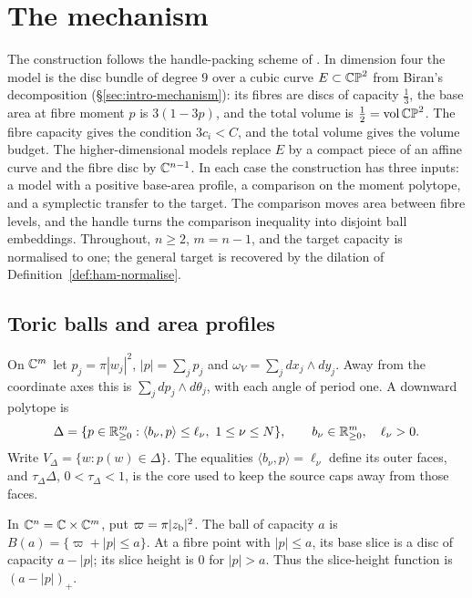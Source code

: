 \section{The mechanism}\label{sec:mech}

The construction follows the handle-packing scheme of \cite{OpenAI2026}. In dimension four the model is
the disc bundle of degree $9$ over a cubic curve $E\subset\mathbb{CP}^2$ from Biran's decomposition \cite{Biran2001}
(\S\ref{sec:intro-mechanism}): its fibres are discs of capacity $\frac13$, the base area at fibre moment $p$ is
$3(1-3p)$, and the total volume is $\frac12=\operatorname{vol}\mathbb{CP}^2$. The fibre capacity gives the condition $3c_i<C$, and the
total volume gives the volume budget. The higher-dimensional models replace $E$ by a compact piece of an affine curve
and the fibre disc by $\mathbb{C}^{n-1}$. In each case the construction has three inputs: a model with a positive base-area
profile, a comparison on the moment polytope, and a symplectic transfer to the target. The comparison moves area
between fibre levels, and the handle turns the comparison inequality into disjoint ball embeddings. Throughout,
$n\ge2$, $m=n-1$, and the target capacity is normalised to one; the general target is recovered by the dilation of
Definition~\ref{def:ham-normalise}.

\subsection{Toric balls and area profiles}\label{sec:mech-toric}

On $\mathbb{C}^m$ let $p_j=\pi|w_j|^2$, $|p|=\sum_jp_j$ and
$\omega_V=\sum_jdx_j\wedge dy_j$. Away from the coordinate axes this is
$\sum_jdp_j\wedge d\theta_j$, with each angle of period one. A downward polytope is
\[
 \Delta=\{p\in\mathbb{R}^m_{\ge0}:\langle b_\nu,p\rangle\le\ell_\nu,\ 1\le\nu\le N\},
 \qquad b_\nu\in\mathbb{R}^m_{\ge0},\quad \ell_\nu>0.
\]
Write $V_\Delta=\{w:p(w)\in\Delta\}$. The equalities
$\langle b_\nu,p\rangle=\ell_\nu$ define its outer faces, and $\tau_\Delta\Delta$,
$0<\tau_\Delta<1$, is the core used to keep the source caps away from those faces.

\begin{definition}\label{def:mech-toric-ball}
In $\mathbb{C}^n=\mathbb{C}\times\mathbb{C}^m$, put $\varpi=\pi|z_{\rm b}|^2$. The ball of capacity $a$ is
$B(a)=\{\varpi+|p|\le a\}$. At a fibre point with $|p|\le a$, its base slice is a disc of capacity $a-|p|$; its slice height is $0$ for $|p|>a$. Thus the slice-height function is $(a-|p|)_+$.
\end{definition}

